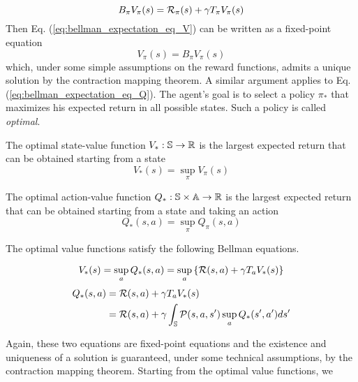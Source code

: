 \begin{equation}
	B_\pi V_\pi(s) = \mathcal{R}_\pi(s) + \gamma T_\pi V_\pi(s)	
\end{equation}
Then Eq. (\ref{eq:bellman_expectation_eq_V}) can be written as a fixed-point equation
\begin{equation}
	V_\pi(s) = B_\pi V_\pi(s)
\end{equation}
which, under some simple assumptions on the reward functions, admits a unique
solution by the contraction mapping theorem. A similar argument applies to Eq.
(\ref{eq:bellman_expectation_eq_Q}). The agent's goal is to select a policy
$\pi_*$ that maximizes his expected return in all possible states. Such a
policy is called \emph{optimal}.
\begin{definition}
	The optimal state-value function $V_*: \mathbb{S} \to \mathbb{R}$ is the largest expected 
	return that can be obtained starting from a state
	\begin{equation}
		V_*(s) = \sup_\pi V_\pi(s)
	\end{equation}
\end{definition}
\begin{definition}
	The optimal action-value function $Q_*: \mathbb{S} \times \mathbb{A} \to \mathbb{R}$ is the largest
	expected return that can be obtained starting from a state and taking an
	action
	\begin{equation}
		Q_*(s,a) = \sup_\pi Q_\pi(s,a)
	\end{equation}
\end{definition}
The optimal value functions satisfy the following Bellman equations.
\begin{proposition}
	\begin{equation}
		V_*(s) = \sup_a Q_*(s,a) = \sup_a \left\{\mathcal{R}(s,a) + \gamma T_a V_*(s)\right\}
	\end{equation}
	\begin{equation}
		\begin{split}
			Q_*(s,a) &= \mathcal{R}(s,a) + \gamma T_a V_*(s)\\
					 &= \mathcal{R}(s,a) + \gamma \int_{\mathbb{S}} \mathcal{P}(s,a,s') \sup_a Q_*(s', a') ds'
		\end{split}
	\end{equation}
\end{proposition}
Again, these two equations are fixed-point equations and the existence and
uniqueness of a solution is guaranteed, under some technical assumptions, by 
the contraction mapping theorem. Starting from the optimal value functions, we

